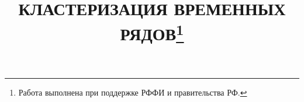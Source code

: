 \documentclass[12pt, twoside]{article}
\begin{document}

\title{ КЛАСТЕРИЗАЦИЯ ВРЕМЕННЫХ РЯДОВ\thanks{Работа выполнена при поддержке РФФИ и правительства РФ.}}
\date{}
\author{}
\maketitle

\end{document}
